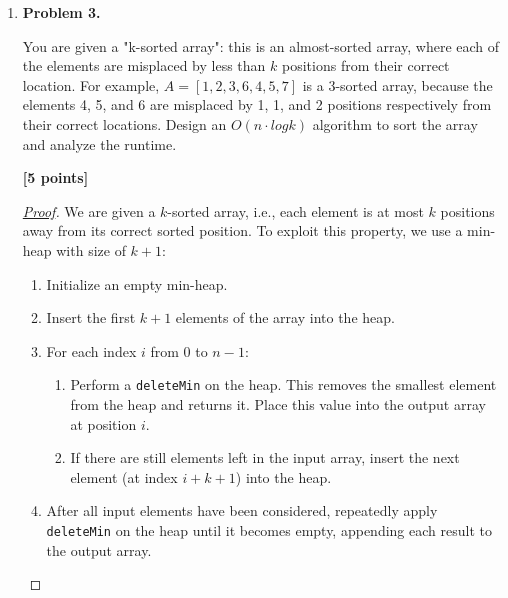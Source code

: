 \documentclass[11pt]{article}
\begin{document}
\begin{enumerate}
\begin{proof}[\underline{Proof}]
\underline{Correctness.} 
The algorithm works because both heaps are min-heaps, so the smallest elements are always available at the root. By comparing the roots at each step, we ensure that no potential common key is skipped: if the roots are equal, we have found a common key; if not, the smaller root cannot possibly appear later in the other heap, so it is safely removed. This guarantees that all possible matches are checked.

\underline{Time Complexity.} 
Each comparison and deletion takes \(O(\log n)\) time. In the worst case, we may perform up to \(n\) deletions (when all elements are distinct). Hence, the overall time complexity is \(O(n \log n)\).
\end{proof}


\item \textbf{Problem 3.}

You are given a "k-sorted array": this is an almost-sorted array, where each of the elements are misplaced by less than \(k\) positions from their correct location. For example, \(A = [1, 2, 3, 6, 4, 5, 7]\) is a 3-sorted array, because the elements 4, 5, and 6 are misplaced by 1, 1, and 2 positions respectively from their correct locations. Design an \(O(n \cdot log k)\) algorithm to sort the array and analyze the runtime.

\begin{flushright}
\end{flushright}

\begin{flushright}
\textbf{[5 points]}
\end{flushright}

\begin{proof}[\underline{Proof}]

We are given a \(k\)-sorted array, i.e., each element is at most \(k\) positions away from its correct sorted position. To exploit this property, we use a min-heap with size of \(k+1\):

\begin{enumerate}[label=\arabic*.]
\item Initialize an empty min-heap.
\item Insert the first $k+1$ elements of the array into the heap.
\item For each index $i$ from $0$ to $n-1$:
\begin{enumerate}
\item Perform a \texttt{deleteMin} on the heap. This removes the smallest element from the heap and returns it. Place this value into the output array at position $i$.
\item If there are still elements left in the input array, insert the next element (at index $i+k+1$) into the heap.
\end{enumerate}
\item After all input elements have been considered, repeatedly apply \texttt{deleteMin} on the heap until it becomes empty, appending each result to the output array.
\end{enumerate}


\end{proof}
\end{enumerate}
\end{document}
